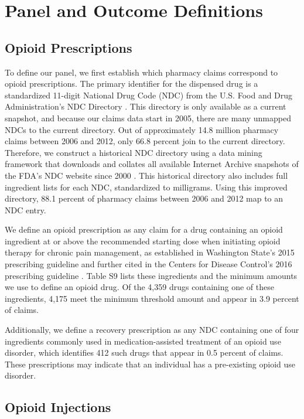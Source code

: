 \documentclass[9pt,twoside]{pnas-new}
\begin{document}
\section{Panel and Outcome Definitions}

\subsection{Opioid Prescriptions}

To define our panel, we first establish which pharmacy claims correspond to opioid prescriptions. The primary identifier for the dispensed drug is a standardized 11-digit National Drug Code (NDC) from the U.S. Food and Drug Administration's NDC Directory \cite{ndc}. This directory is only available as a current snapshot, and because our claims data start in 2005, there are many unmapped NDCs to the current directory. Out of approximately 14.8 million pharmacy claims between 2006 and 2012, only 66.8 percent join to the current directory. Therefore, we construct a historical NDC directory using a data mining framework that downloads and collates all available Internet Archive snapshots of the FDA's NDC website since 2000 \cite{historicalndc}. This historical directory also includes full ingredient lists for each NDC, standardized to milligrams. Using this improved directory, 88.1 percent of pharmacy claims between 2006 and 2012 map to an NDC entry. 

We define an opioid prescription as any claim for a drug containing an opioid ingredient at or above the recommended starting dose when initiating opioid therapy for chronic pain management, as established in Washington State's 2015 prescribing guideline and further cited in the Centers for Disease Control's 2016 prescribing guideline \cite{amdg, dowell}. Table S9 lists these ingredients and the minimum amounts we use to define an opioid drug. Of the 4,359 drugs containing one of these ingredients, 4,175 meet the minimum threshold amount and appear in 3.9 percent of claims.

Additionally, we define a recovery prescription as any NDC containing one of four ingredients commonly used in medication-assisted treatment of an opioid use disorder, which identifies 412 such drugs that appear in 0.5 percent of claims. These prescriptions may indicate that an individual has a pre-existing opioid use disorder.

\subsection{Opioid Injections}
\end{document}
